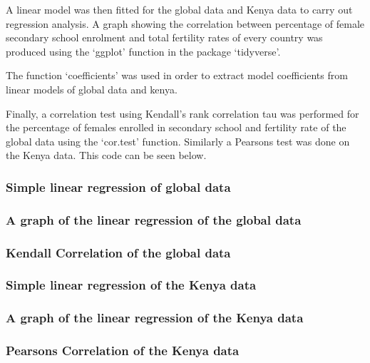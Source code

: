 \documentclass[11pt,]{article}
\begin{document}
A linear model was then fitted for the global data and Kenya data to
carry out regression analysis. A graph showing the correlation between
percentage of female secondary school enrolment and total fertility
rates of every country was produced using the `ggplot' function in the
package `tidyverse'.

The function `coefficients' was used in order to extract model
coefficients from linear models of global data and kenya.

Finally, a correlation test using Kendall's rank correlation tau was
performed for the percentage of females enrolled in secondary school and
fertility rate of the global data using the `cor.test' function.
Similarly a Pearsons test was done on the Kenya data. This code can be
seen below.

\subsubsection{Simple linear regression of global
data}\label{simple-linear-regression-of-global-data}

\subsubsection{A graph of the linear regression of the global
data}\label{a-graph-of-the-linear-regression-of-the-global-data}

\subsubsection{Kendall Correlation of the global
data}\label{kendall-correlation-of-the-global-data}

\subsubsection{Simple linear regression of the Kenya
data}\label{simple-linear-regression-of-the-kenya-data}

\subsubsection{A graph of the linear regression of the Kenya
data}\label{a-graph-of-the-linear-regression-of-the-kenya-data}

\subsubsection{Pearsons Correlation of the Kenya
data}\label{pearsons-correlation-of-the-kenya-data}
\end{document}
